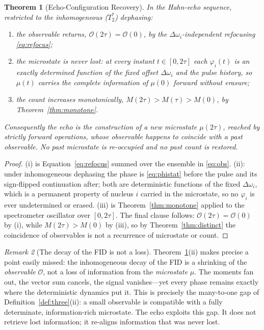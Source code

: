 \documentclass[11pt,a4paper]{article}
\theoremstyle{thmstyle}
\newtheorem{theorem}{Theorem}[section]
\theoremstyle{definition}
\theoremstyle{remark}
\newtheorem{remark}[theorem]{Remark}
\newcommand{\Tprep}{T_{2}^{*}}
\newcommand{\Obs}{\mathcal{O}}
\newcommand{\Mic}{\mu}
\newcommand{\Count}{M}
\begin{document}
\begin{theorem}[Echo-Configuration Recovery]
\label{thm:config}
In the Hahn-echo sequence, restricted to the inhomogeneous
($\Tprep$) dephasing:
\begin{enumerate}[leftmargin=1.6em,label=(\roman*),itemsep=0.2em]
\item the observable returns, $\Obs(2\tau)=\Obs(0)$, by the
$\Delta\omega_{i}$-independent refocusing \eqref{eq:refocus};
\item the microstate is never lost: at every instant $t\in[0,2\tau]$
each $\varphi_{i}(t)$ is an exactly determined function of the fixed
offset $\Delta\omega_{i}$ and the pulse history, so $\Mic(t)$ carries the
complete information of $\Mic(0)$ forward without erasure;
\item the count increases monotonically, $\Count(2\tau)>\Count(\tau)>
\Count(0)$, by Theorem~\ref{thm:monotone}.
\end{enumerate}
Consequently the echo is the construction of a \emph{new} microstate
$\Mic(2\tau)$, reached by strictly forward operations, whose
\emph{observable} happens to coincide with a past observable. No past
microstate is re-occupied and no past count is restored.
\end{theorem}

\begin{proof}
(i) is Equation~\eqref{eq:refocus} summed over the ensemble in
\eqref{eq:obs}. (ii): under inhomogeneous dephasing the phase is
\eqref{eq:phistat} before the pulse and its sign-flipped continuation
after; both are deterministic functions of the fixed $\Delta\omega_{i}$,
which is a permanent property of nucleus $i$ carried in the microstate,
so no $\varphi_{i}$ is ever undetermined or erased. (iii) is
Theorem~\ref{thm:monotone} applied to the spectrometer oscillator over
$[0,2\tau]$. The final clause follows: $\Obs(2\tau)=\Obs(0)$ by (i),
while $\Count(2\tau)>\Count(0)$ by (iii), so by
Theorem~\ref{thm:distinct} the coincidence of observables is not a
recurrence of microstate or count.
\end{proof}

\begin{remark}[The decay of the FID is not a loss]
\label{rem:not-loss}
Theorem~\ref{thm:config}(ii) makes precise a point easily missed: the
inhomogeneous decay of the FID is a shrinking of the \emph{observable}
$\Obs$, not a loss of information from the \emph{microstate} $\Mic$. The
moments fan out, the vector sum cancels, the signal vanishes---yet every
phase remains exactly where the deterministic dynamics put it. This is
precisely the many-to-one gap of Definition~\ref{def:three}(ii): a small
observable is compatible with a fully determinate, information-rich
microstate. The echo exploits this gap. It does not retrieve lost
information; it re-aligns information that was never lost.
\end{remark}
\end{document}
